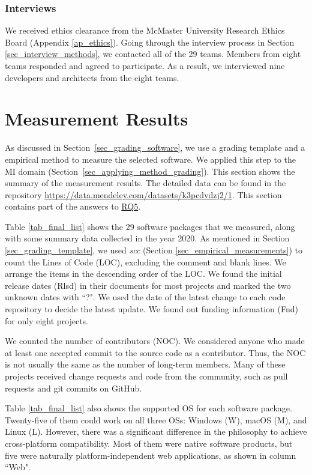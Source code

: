 \documentclass[3p, 12pt,authoryear]{elsarticle}
\begin{document}
\subsubsection{Interviews}
\label{sec_apply_to_mi_interviews}
We received ethics clearance from the McMaster University Research Ethics Board
(Appendix \ref{ap_ethics}). Going through the interview process in Section
\ref{sec_interview_methods}, we contacted all of the 29 teams. Members from
eight teams responded and agreed to participate. As a result, we interviewed
nine developers and architects from the eight teams.

\section{Measurement Results} \label{ch_results}

As discussed in Section~\ref{sec_grading_software}, we use a grading template
and a empirical method to measure the selected software. We applied this step to
the MI domain (Section~\ref{sec_applying_method_grading}). This section shows
the summary of the measurement results. The detailed data can be found in the
repository
\hyperlink{https://data.mendeley.com/datasets/k3pcdvdzj2/1}{https://data.mendeley.com/datasets/k3pcdvdzj2/1}.
This section contains part of the answers to \hyperlink{rq5}{RQ5}.

Table \ref{tab_final_list} shows the 29 software packages that we measured,
along with some summary data collected in the year 2020. As mentioned in Section
\ref{sec_grading_template}, we used \textit{scc} (Section
\ref{sec_empirical_measurements}) to count the Lines of Code (LOC), excluding
the comment and blank lines. We arrange the items in the descending order of the
LOC. We found the initial release dates (Rlsd) in their documents for most
projects and marked the two unknown dates with ``?". We used the date of the
latest change to each code repository to decide the latest update. We found out
funding information (Fnd) for only eight projects.

We counted the number of contributors (NOC). We considered anyone who made at
least one accepted commit to the source code as a contributor. Thus, the NOC is
not usually the same as the number of long-term members. Many of these projects
received change requests and code from the community, such as pull requests and
git commits on GitHub.

Table \ref{tab_final_list} also shows the supported OS for each software
package. Twenty-five of them could work on all three OSs: Windows (W), macOS
(M), and Linux (L). However, there was a significant difference in the
philosophy to achieve cross-platform compatibility. Most of them were native
software products, but five were naturally platform-independent web
applications, as shown in column ``Web".
\end{document}
